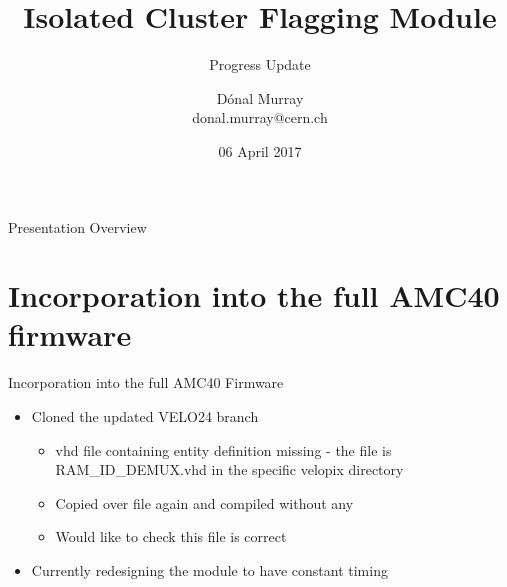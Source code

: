 \documentclass{beamer}
\title[ICF Module]{Isolated Cluster Flagging Module}
\subtitle{Progress Update}
\author[Dónal Murray\hspace*{80pt}donal.murray@cern.ch]{Dónal Murray \\
  \vskip7pt
  \tiny{donal.murray@cern.ch}
}
\institute{}
\date{06 April 2017}
\begin{document}
{
\begin{frame}
  \titlepage
\end{frame}
}
\addtocounter{framenumber}{-1} %

\begin{frame}{Presentation Overview}
  \tableofcontents
\end{frame}





\section{Incorporation into the full AMC40 firmware}

\begin{frame}{Incorporation into the full AMC40 Firmware}
  \begin{itemize}
    \item
      Cloned the updated VELO24 branch
      \begin{itemize}
        \item
          vhd file containing entity definition missing - the file is RAM\_ID\_DEMUX.vhd
          in the specific velopix directory
        \item
          Copied over file again and compiled without any
        \item
          Would like to check this file is correct
      \end{itemize}
    \item
      Currently redesigning the module to have constant timing
    \end{itemize}
\end{frame}
\end{document}
